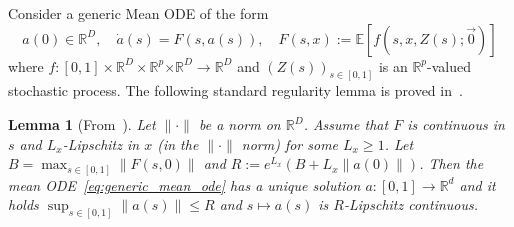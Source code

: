 \documentclass[a4paper,11pt]{article}
\newcommand{\R}{\mathbb{R}}
\newcommand{\1}{\mathbbm{1}}
\newtheorem{lemma}[theorem]{Lemma}
\theoremstyle{definition}
\theoremstyle{remark}
\begin{document}
Consider a generic Mean ODE of the form
\begin{equation}\label{eq:generic_mean_ode}
    a(0) \in \R^D, \quad \dot{a}(s) = F(s, a(s)), \quad F(s,x) := \mathbb{E}[f(s,x,Z(s){;\vec{0}})]
\end{equation}
where $f : [0,1] \times \R^D \times \R^p{\times\R^{D}} \to \R^{D}$ and $(Z(s))_{s \in [0,1]}$ is an $\R^p$-valued stochastic process. The following standard regularity lemma is proved in~\cite[Lemma 5.1]{chizat2025hidden}.

\begin{lemma}[From~\cite{chizat2025hidden}]\label{lem:basic_regularity_mean_ode}
Let $\|\cdot\|$ be a norm on $\R^D$. Assume that $F$ is continuous in $s$ and $L_x$-Lipschitz in $x$ (in the $\|\cdot\|$ norm) for some $L_x \geq 1$. Let $B = \max_{s \in [0,1]} \|F(s,0)\|$ and $R := e^{L_x}(B + L_x\|a(0)\|)$. Then the mean ODE~\eqref{eq:generic_mean_ode} has a unique solution $a : [0,1] \to \R^d$ and it holds $\sup_{s \in [0,1]} \|a(s)\| \le R$ and $s \mapsto a(s)$ is $R$-Lipschitz continuous.
\end{lemma}
\end{document}
